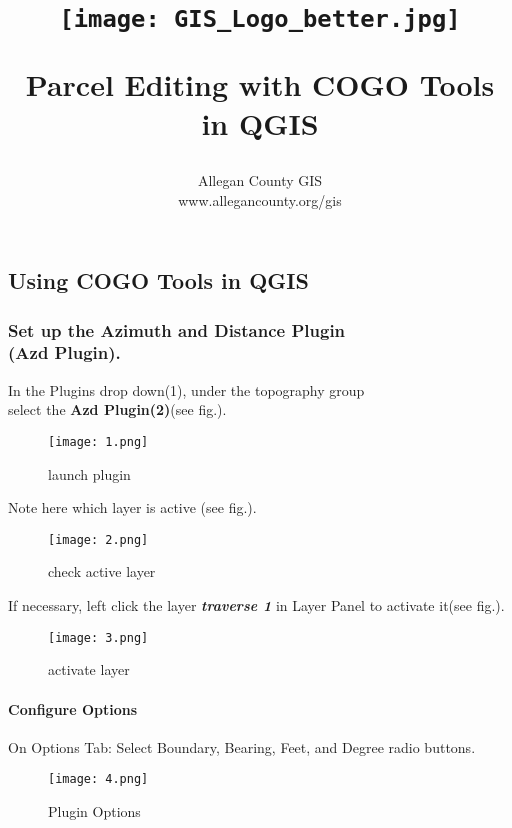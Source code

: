 \documentclass[class=book , crop=false]{standalone}
\title{ %
\HRule %
\\[.4cm] %
\begin{figure}[H] %
\begin{center}	%
	\texttt{[image: GIS\_Logo\_better.jpg]}
	\end{center}
	\end{figure}
	\Huge \bfseries Parcel Editing with COGO Tools in QGIS %
\HRule \\[.4cm] %
}  %
\author{\Large Allegan County GIS \\\Large www.allegancounty.org/gis} %
\begin{document}


\subsection{Using COGO Tools in QGIS}
	\medskip 
	\subsubsection{\Large Set up the Azimuth and Distance Plugin \\\small(Azd Plugin).}
	\medskip
		\large In the Plugins drop down(1), \large under the topography group\\\Large select the \textbf {Azd Plugin(2)}(see fig.).
		\begin{figure}[H] %
		\begin{center}
		\texttt{[image: 1.png]}
		\end{center}
		\caption{launch plugin}
		\end{figure}
\clearpage
		
		\large Note here which layer is active (see fig.).
		\begin{figure}[H] %
		\begin{center}
		\texttt{[image: 2.png]}
		\end{center}
		\caption{check active layer}
		\end{figure}


		If necessary, left click the layer \textbf {\emph{traverse 1}} in Layer Panel to activate it(see fig.).
			\begin{figure}[H] %
			\begin{center}
			\texttt{[image: 3.png]}
			\end{center}
			\caption{activate layer}
			\end{figure}

\clearpage

		\paragraph{Configure Options}
			\large On Options Tab: Select Boundary, Bearing, Feet, and Degree radio buttons.
			\begin{figure}[H]
			\begin{center}
			\texttt{[image: 4.png]}
			\end{center}
			\caption{Plugin Options}
			\end{figure}
\clearpage
\end{document}
